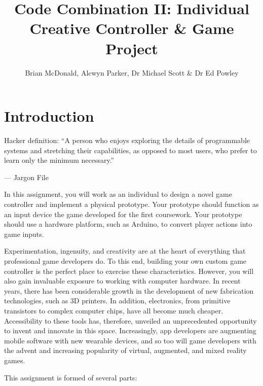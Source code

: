 \documentclass{../../fal_assignment}
\title{Code Combination II: Individual Creative Controller \& Game Project}
\author{Brian McDonald, Alcwyn Parker, Dr Michael Scott \& Dr Ed Powley}
\begin{document}
\maketitle

\section*{Introduction}

\begin{marginquote}
Hacker definition: ``A person who enjoys exploring the details of programmable systems and stretching their capabilities, as opposed to most users, who prefer to learn only the minimum necessary.''

--- Jargon File

\end{marginquote}

In this assignment, you will work as an individual to design a novel game controller and implement a physical prototype. Your prototype should function as an input device the game developed for the first coursework. Your prototype should use a hardware platform, such as Arduino, to convert player actions into game inputs. 

Experimentation, ingenuity, and creativity are at the heart of everything that professional game developers do. To this end, building your own custom game controller is the perfect place to exercise these characteristics. However, you will also gain invaluable exposure to working with computer hardware. In recent years, there has been considerable growth in the development of new fabrication technologies, such as 3D printers. In addition, electronics, from primitive transistors to complex computer chips, have all become much cheaper. Accessibility to these tools has, therefore, unveiled an unprecedented opportunity to invent and innovate in this space. Increasingly, app developers are augmenting mobile software with new wearable devices, and so too will game developers with the advent and increasing popularity of virtual, augmented, and mixed reality games.

This assignment is formed of several parts:
\end{document}
